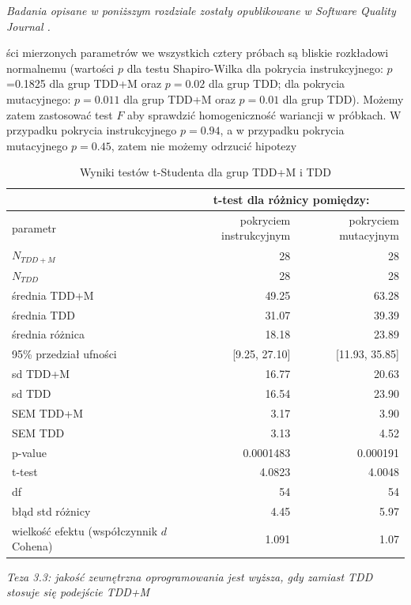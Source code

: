 \documentclass[11pt,a4paper,oldfontcommands]{memoir}
\theoremstyle{plain}
\theoremstyle{definition}
\theoremstyle{remark}
\begin{document}
\textit{Badania opisane w poniższym rozdziale zostały opublikowane w Software Quality Journal \cite{MnichRoman}. }  

ści mierzonych parametrów we wszystkich cztery próbach są bliskie rozkładowi normalnemu (wartości $p$ dla testu Shapiro-Wilka dla pokrycia instrukcyjnego: $p$=0.1825 dla grup TDD+M oraz $p=0.02$ dla grup TDD; dla pokrycia mutacyjnego: $p=0.011$ dla grup TDD+M oraz $p=0.01$ dla grup TDD). Możemy zatem zastosować test $F$ aby sprawdzić homogeniczność wariancji w próbkach. W przypadku pokrycia instrukcyjnego $p=0.94$, a w przypadku pokrycia mutacyjnego $p=0.45$, zatem nie możemy odrzucić hipotezy 

\newpage
\begin{table}[!ht]
\centering
\caption{Wyniki testów t-Studenta dla grup TDD+M i TDD\label{tab:StudentTest}}
\begin{tabular}{lrr}
\hline
 & \multicolumn{2}{c}{t-test dla różnicy pomiędzy:} \\ \hline
parametr & pokryciem instrukcyjnym & pokryciem mutacyjnym \\ \hline
$N_{TDD+M}$         & 28 & 28 \\
$N_{TDD}$           & 28 & 28 \\ \hline
średnia TDD+M          & 49.25 & 63.28 \\
średnia TDD            & 31.07 & 39.39\\
średnia różnica     & 18.18 & 23.89 \\ 
95\% przedział ufności & [9.25, 27.10] & [11.93, 35.85]\\ 
sd TDD+M            & 16.77 & 20.63 \\
sd TDD              & 16.54 & 23.90\\ 
SEM TDD+M           & 3.17 & 3.90\\
SEM TDD             & 3.13 & 4.52 \\ \hline
p-value             & 0.0001483 & 0.000191 \\
t-test              & 4.0823 & 4.0048 \\ 
df & 54 & 54 \\ 
błąd std różnicy & 4.45 & 5.97 \\
wielkość efektu (współczynnik $d$ Cohena) & 1.091 & 1.07 \\ \hline
\end{tabular}
\end{table}


\textit{Teza 3.3: jakość zewnętrzna oprogramowania jest wyższa, gdy zamiast TDD stosuje się podejście TDD+M}
\end{document}
